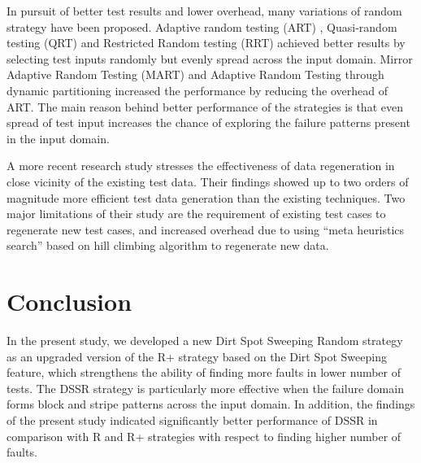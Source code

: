 \documentclass[conference]{IEEEtran}
\begin{document}
In pursuit of better test results and lower overhead, many variations of random strategy have been proposed. Adaptive random testing (ART) \cite{Chen2010}, Quasi-random testing (QRT) \cite{Chen2005} and Restricted Random testing (RRT) \cite{Chan2002} achieved better results by selecting test inputs randomly but evenly spread across the input domain. Mirror Adaptive Random Testing (MART) \cite{Chen2003} and Adaptive Random Testing through dynamic partitioning \cite{Chen2003} increased the performance by reducing the overhead of ART. The main reason behind better performance of the strategies is that even spread of test input increases the chance of exploring the failure patterns present in the input domain.

A more recent research study \cite{Yoo2012} stresses the effectiveness of data regeneration in close vicinity of the existing test data. Their findings showed up to two orders of magnitude more efficient test data generation than the existing techniques. Two major limitations of their study are the requirement of existing test cases to regenerate new test cases, and increased overhead due to using ``meta heuristics search'' based on hill climbing algorithm to regenerate new data. 
  





\section{Conclusion}\label{sec:conc}
In the present study, we developed a new Dirt Spot Sweeping Random strategy as an upgraded version of the R+ strategy based on the Dirt Spot Sweeping feature, which strengthens the ability of finding more faults in lower number of tests. The DSSR strategy is particularly more effective when the failure domain forms block and stripe patterns across the input domain. In addition, the findings of the present study indicated significantly better performance of DSSR in comparison with R and R+ strategies with respect to finding higher number of faults. 
\end{document}
